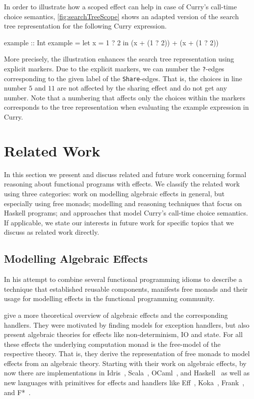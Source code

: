 In order to illustrate how a scoped effect can help in case of Curry's call\--time choice semantics, \autoref{fig:searchTreeScope} shows an adapted version of the search tree representation for the following Curry expression.

\begin{curry}
example :: Int
example = let x = 1 ? 2 in (x + (1 ? 2)) + (x + (1 ? 2))  
\end{curry}

More precisely, the illustration enhances the search tree representation using explicit markers.
Due to the explicit markers, we can number the \texttt{?}\--edges corresponding to the given label of the \texttt{Share}\--edges.
That is, the choices in line number $5$ and $11$ are not affected by the sharing effect and do not get any number.
Note that a numbering that affects only the choices within the markers corresponds to the tree representation when evaluating the example expression in Curry.

\section{Related Work}

In this section we present and discuss related and future work concerning formal reasoning about functional programs with effects.
We classify the related work using three categories: work on modelling algebraic effects in general, but especially using free monads; modelling and reasoning techniques that focus on Haskell programs; and approaches that model Curry's call\--time choice semantics.
If applicable, we state our interests in future work for specific topics that we discuss as related work directly.

\subsection{Modelling Algebraic Effects}

In his attempt to combine several functional programming idioms to describe a technique that established reusable components, \citet{swierstra2008data} manifests free monads and their usage for modelling effects in the functional programming community.

\citet{plotkin2009handlers} give a more theoretical overview of algebraic effects and the corresponding handlers.
They were motivated by finding models for exception handlers, but also present algebraic theories for effects like non\--determinism, IO and state.
For all these effects the underlying computation monad is the free\--model of the respective theory.
That is, they derive the representation of free monads to model effects from an algebraic theory.
Starting with their work on algebraic effects, by now there are implementations in Idris~\citep{brady2013programming}, Scala~\citep{brachthauser2017effekt}, OCaml~\citep{kiselyov2018eff}, and Haskell~\citep{kiselyov2015freer,kammar2013handlers} as well as new languages with primitives for effects and handlers like Eff~\citep{pretnar2015introduction}, Koka~\citep{leijen2016algebraic}, Frank~\citep{lindley2017be}, and F*~\citep{swamy2016dependent}.

